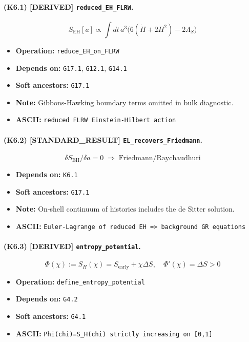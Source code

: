 \documentclass[11pt,a4paper]{article}
\theoremstyle{remark}\newtheorem*{caution}{Caution}
\newcommand{\tagbox}[1]{\textsc{[#1]}}
\begin{document}
\paragraph{(K6.1) \tagbox{DERIVED} \texttt{reduced\_EH\_FLRW}.}
\begin{equation}
S_{\mathrm{EH}}[a]\propto\int dt\,a^3\bigl(6(\dot H+2H^2)-2\Lambda_S\bigr)
\tag{K6.1}
\end{equation}
\begin{itemize}\setlength{\itemsep}{0.12em}
\item \textbf{Operation:} \texttt{reduce\_EH\_on\_FLRW}
\item \textbf{Depends on:} \texttt{G17.1}, \texttt{G12.1}, \texttt{G14.1}
\item \textbf{Soft ancestors:} \texttt{G17.1}
\item \textbf{Note:} Gibbons-Hawking boundary terms omitted in bulk diagnostic.
\item \textbf{ASCII:} \texttt{reduced FLRW Einstein-Hilbert action}
\end{itemize}
\paragraph{(K6.2) \tagbox{STANDARD\_RESULT} \texttt{EL\_recovers\_Friedmann}.}
\begin{equation}
\delta S_{\mathrm{EH}}/\delta a=0\;\Rightarrow\;\text{Friedmann/Raychaudhuri}
\tag{K6.2}
\end{equation}
\begin{itemize}\setlength{\itemsep}{0.12em}
\item \textbf{Depends on:} \texttt{K6.1}
\item \textbf{Soft ancestors:} \texttt{G17.1}
\item \textbf{Note:} On-shell continuum of histories includes the de Sitter solution.
\item \textbf{ASCII:} \texttt{Euler-Lagrange of reduced EH => background GR equations}
\end{itemize}
\paragraph{(K6.3) \tagbox{DERIVED} \texttt{entropy\_potential}.}
\begin{equation}
\Phi(\chi):=S_H(\chi)=S_{\mathrm{early}}+\chi\Delta S,\quad \Phi'(\chi)=\Delta S>0
\tag{K6.3}
\end{equation}
\begin{itemize}\setlength{\itemsep}{0.12em}
\item \textbf{Operation:} \texttt{define\_entropy\_potential}
\item \textbf{Depends on:} \texttt{G4.2}
\item \textbf{Soft ancestors:} \texttt{G4.1}
\item \textbf{ASCII:} \texttt{Phi(chi)=S\_H(chi) strictly increasing on [0,1]}
\end{itemize}
\end{document}
